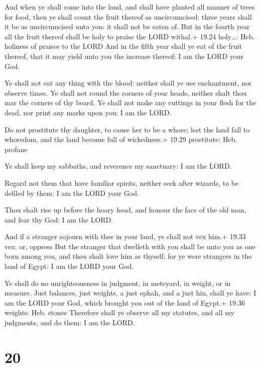  And when ye shall come into the land, and shall have
planted all manner of trees for food, then ye shall count the fruit
thereof as uncircumcised: three years shall it be as uncircumcised unto
you: it shall not be eaten of.  But in the fourth year all
the fruit thereof shall be holy to praise the LORD withal.+ 19.24
holy\ldots: Heb. holiness of praises to the LORD  And in
the fifth year shall ye eat of the fruit thereof, that it may yield unto
you the increase thereof: I am the LORD your God.

 Ye shall not eat any thing with the blood: neither shall
ye use enchantment, nor observe times.  Ye shall not round
the corners of your heads, neither shalt thou mar the corners of thy
beard.  Ye shall not make any cuttings in your flesh for
the dead, nor print any marks upon you: I am the LORD.

 Do not prostitute thy daughter, to cause her to be a
whore; lest the land fall to whoredom, and the land become full of
wickedness.+ 19.29 prostitute: Heb. profane

 Ye shall keep my sabbaths, and reverence my sanctuary: I
am the LORD.

 Regard not them that have familiar spirits, neither seek
after wizards, to be defiled by them: I am the LORD your God.

 Thou shalt rise up before the hoary head, and honour the
face of the old man, and fear thy God: I am the LORD.

 And if a stranger sojourn with thee in your land, ye
shall not vex him.+ 19.33 vex: or, oppress  But the
stranger that dwelleth with you shall be unto you as one born among you,
and thou shalt love him as thyself; for ye were strangers in the land of
Egypt: I am the LORD your God.

 Ye shall do no unrighteousness in judgment, in meteyard,
in weight, or in measure.  Just balances, just weights, a
just ephah, and a just hin, shall ye have: I am the LORD your God, which
brought you out of the land of Egypt.+ 19.36 weights: Heb. stones
 Therefore shall ye observe all my statutes, and all my
judgments, and do them: I am the LORD.

\hypertarget{section-19}{%
\section{20}\label{section-19}}

